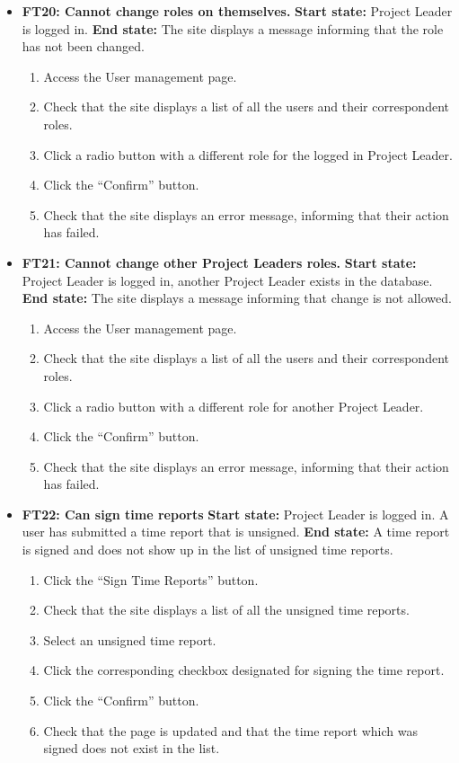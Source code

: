 \documentclass{article}
\begin{document}
\begin{itemize}
		\item \textbf{FT20: Cannot change roles on themselves.} \newline
		\textbf{Start state:} Project Leader is logged in. \newline
		\textbf{End state:} The site displays a message informing that the role has not been changed. 
		\begin{enumerate}
			\item Access the User management page.
			\item Check that the site displays a list of all the users and their correspondent roles.
			\item Click a radio button with a different role for the logged in Project Leader.
			\item Click the “Confirm” button. 
			\item Check that the site displays an error message, informing that their action has failed. 
		\end{enumerate}
		
		\item \textbf{FT21: Cannot  change other Project Leaders roles.}\newline
		\textbf{Start state:} Project Leader is logged in, another Project Leader exists in the database.  \newline
		\textbf{End state:} The site displays a message informing that change is not allowed.
		\begin{enumerate}
			\item Access the User management page.
			\item Check that the site displays a list of all the users and their correspondent roles.
			\item Click a radio button with a different role for another Project Leader.
			\item Click the “Confirm” button. 
			\item Check that the site displays an error message, informing that their action has failed.
		\end{enumerate}
		
		\item \textbf{FT22: Can sign time reports}\newline
		\textbf{Start state:} Project Leader is logged in. A user has submitted a time report that is unsigned.  \newline
		\textbf{End state:} A time report is signed and does not show up in the list of unsigned time reports.
		\begin{enumerate}
			\item Click the “Sign Time Reports” button.
			\item Check that the site displays a list of all the unsigned time reports.
			\item Select an unsigned time report.
			\item Click the corresponding checkbox designated for signing the time report.
			\item Click the “Confirm” button.
			\item Check that the page is updated and that the time report which was signed does not exist in the list.
		\end{enumerate}
		

\end{itemize}
\end{document}
